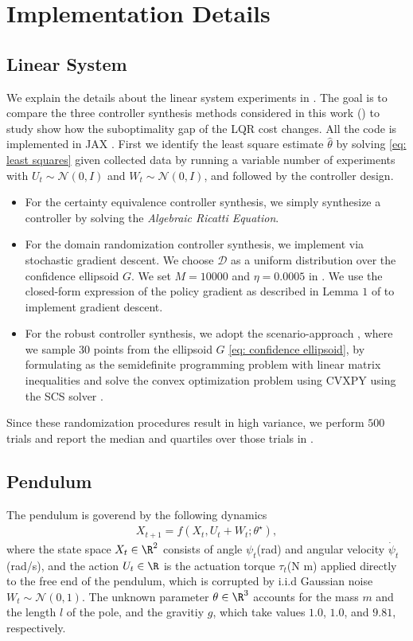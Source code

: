 \section{Implementation Details}
\label{s: implementation details}
\subsection{Linear System}
We explain the details about the linear system experiments in . The goal is to compare the three controller synthesis methods considered in this work () to study show how the suboptimality gap of the LQR cost changes. 
All the code is implemented in JAX \citep{jax2018github}. 
First we identify the least square estimate $\hat\theta$ by solving \eqref{eq: least squares} given collected data by running a variable number of experiments with $U_t\sim\mathcal{N}(0, I)$ and $W_t\sim\mathcal{N}(0, I)$, and followed by the controller design. 
\begin{itemize}
\item 
For the certainty equivalence controller synthesis, we simply synthesize a controller by solving the \textit{Algebraic Ricatti Equation}. 
\item 
For the domain randomization controller synthesis, we implement  via stochastic gradient descent. 
We choose $\mathcal{D}$ as a uniform distribution over the confidence ellipsoid $G$. We set $M = 10000$ and $\eta=0.0005$ in . We use the closed-form expression of the policy gradient as described in Lemma $1$ of \cite{fazel2018global} to implement gradient descent. 
\item 
For the robust controller synthesis, we adopt the scenario-approach \citep{calafiore2006scenario}, where we sample 30 points from the ellipsoid $G$ \eqref{eq: confidence ellipsoid}, by formulating as the semidefinite programming problem with linear matrix inequalities \citep{caverly2019lmi} and solve the convex optimization problem using CVXPY \citep{diamond2016cvxpy} using the SCS solver \citep{ocpb:16}. 
\end{itemize}

Since these randomization procedures result in high variance, we perform $500$ trials and report the median and quartiles over those trials in . 

\subsection{Pendulum}
The pendulum is goverend by the following dynamics
\begin{align*}
    X_{t+1} = f(X_t, U_t+W_t; \theta^\star),
\end{align*}
where the state space $X_t\in\R^2$ consists of angle $\psi_t$(rad) and angular velocity $\dot\psi_t$(rad/s), and the action $U_t\in\R$ is the actuation torque $\tau_t$(N m) applied directly to the free end of the pendulum, which is corrupted by i.i.d Gaussian noise $W_t \sim \mathcal{N}(0, 1)$. The unknown parameter $\theta\in\R^3$ accounts for the mass $m$ and the length $l$ of the pole, and the gravitiy $g$, which take values $1.0$, $1.0$, and $9.81$, respectively.  

